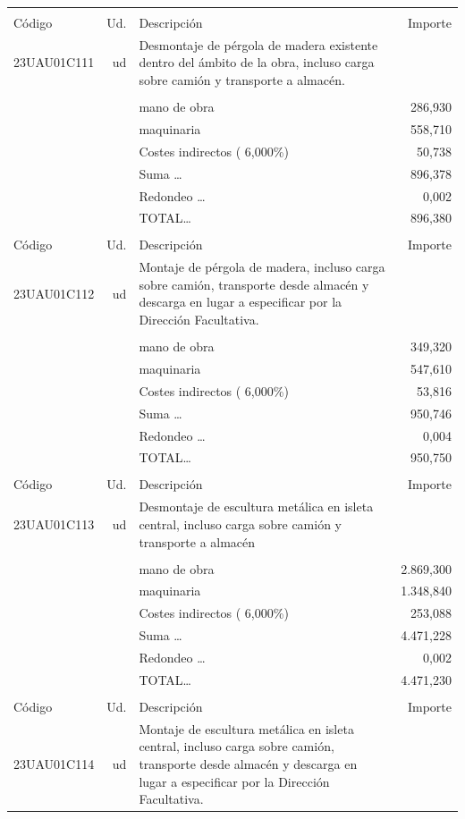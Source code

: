 \begin{supertabular}{l r p{60mm} r}
&&&\\%
Código&Ud.&Descripción&Importe\\%
\hline%
23UAU01C111&ud&Desmontaje de pérgola de madera existente dentro del ámbito de la obra, incluso carga sobre camión y transporte a almacén.&\\%
&&&\\%
&&mano de obra&   286,930\\%
&&maquinaria&   558,710\\%
&&Costes indirectos (     6,000\%)&    50,738\\%
&&Suma \ldots&   896,378\\%
&&Redondeo \ldots&     0,002\\%
%
&&TOTAL\ldots&   896,380\\%
&&&\\%
Código&Ud.&Descripción&Importe\\%
\hline%
23UAU01C112&ud&Montaje de pérgola de madera, incluso carga sobre camión, transporte desde almacén y descarga en lugar a especificar por la Dirección Facultativa.&\\%
&&&\\%
&&mano de obra&   349,320\\%
&&maquinaria&   547,610\\%
&&Costes indirectos (     6,000\%)&    53,816\\%
&&Suma \ldots&   950,746\\%
&&Redondeo \ldots&     0,004\\%
%
&&TOTAL\ldots&   950,750\\%
&&&\\%
Código&Ud.&Descripción&Importe\\%
\hline%
23UAU01C113&ud&Desmontaje de escultura metálica en isleta central, incluso carga sobre camión y transporte a almacén&\\%
&&&\\%
&&mano de obra& 2.869,300\\%
&&maquinaria& 1.348,840\\%
&&Costes indirectos (     6,000\%)&   253,088\\%
&&Suma \ldots& 4.471,228\\%
&&Redondeo \ldots&     0,002\\%
%
&&TOTAL\ldots& 4.471,230\\%
&&&\\%
Código&Ud.&Descripción&Importe\\%
\hline%
23UAU01C114&ud&Montaje de escultura metálica en isleta central, incluso carga sobre camión, transporte desde almacén y descarga en lugar a especificar por la Dirección Facultativa.&\\%

\end{supertabular}
